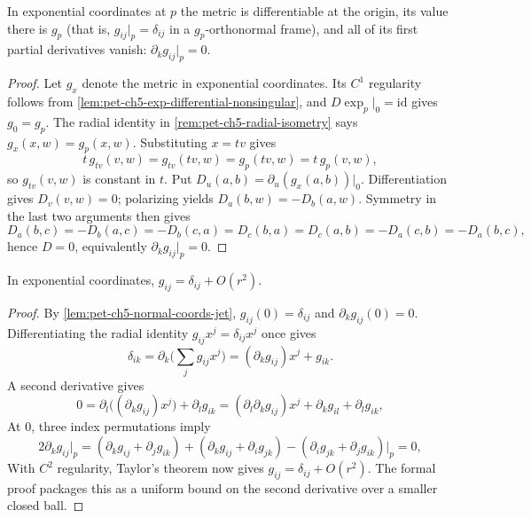 \begin{lemma}
  \label{lem:pet-ch5-normal-coords-jet}
  \leanok
  In exponential coordinates at $p$ the metric is differentiable at the origin, its
  value there is $g_p$ (that is, $g_{ij}|_p=\delta_{ij}$ in a $g_p$-orthonormal
  frame), and all of its first partial derivatives vanish: $\partial_kg_{ij}|_p=0$.
\end{lemma}
\begin{proof}
  \leanok
  \sketch
  Let $g_x$ denote the metric in exponential coordinates.  Its $C^1$ regularity
  follows from \cref{lem:pet-ch5-exp-differential-nonsingular}, and
  $D\exp_p|_0=\mathrm{id}$ gives $g_0=g_p$.  The radial identity in
  \cref{rem:pet-ch5-radial-isometry} says $g_x(x,w)=g_p(x,w)$.  Substituting
  $x=tv$ gives
  \[
    t\,g_{tv}(v,w)=g_{tv}(tv,w)=g_p(tv,w)=t\,g_p(v,w),
  \]
  so $g_{tv}(v,w)$ is constant in $t$.  Put
  $D_u(a,b)=\partial_u(g_x(a,b))|_0$.  Differentiation gives $D_v(v,w)=0$;
  polarizing yields $D_a(b,w)=-D_b(a,w)$.  Symmetry in the last two arguments then
  gives
  \[
    D_a(b,c)=-D_b(a,c)=-D_b(c,a)=D_c(b,a)=D_c(a,b)=-D_a(c,b)=-D_a(b,c),
  \]
  hence $D=0$, equivalently $\partial_kg_{ij}|_p=0$.
\end{proof}

\begin{lemma}
  \label{lem:pet-ch5-normal-coords-first-order}
  \leanok
  In exponential coordinates, $g_{ij}=\delta_{ij}+O(r^2)$.
\end{lemma}
\begin{proof}
  \leanok
  \sketch
  By \cref{lem:pet-ch5-normal-coords-jet}, $g_{ij}(0)=\delta_{ij}$ and
  $\partial_kg_{ij}(0)=0$.  Differentiating the radial identity
  $g_{ij}x^j=\delta_{ij}x^j$ once gives
  \[
    \delta_{ik}=\partial_k\Big(\sum_jg_{ij}x^j\Big)=(\partial_kg_{ij})x^j+g_{ik}.
  \]
  A second derivative gives
  \[
    0=\partial_l\big((\partial_kg_{ij})x^j\big)+\partial_lg_{ik}
    =(\partial_l\partial_kg_{ij})x^j+\partial_kg_{il}+\partial_lg_{ik},
  \]
  At $0$, three index permutations imply
  \[
    2\partial_kg_{ij}|_p=(\partial_kg_{ij}+\partial_jg_{ik})+(\partial_kg_{ij}+\partial_ig_{jk})
    -(\partial_ig_{jk}+\partial_jg_{ik})\Big|_p=0,
  \]
  With $C^2$ regularity, Taylor's theorem now gives
  $g_{ij}=\delta_{ij}+O(r^2)$. The formal proof packages this as a uniform bound
  on the second derivative over a smaller closed ball.
\end{proof}

